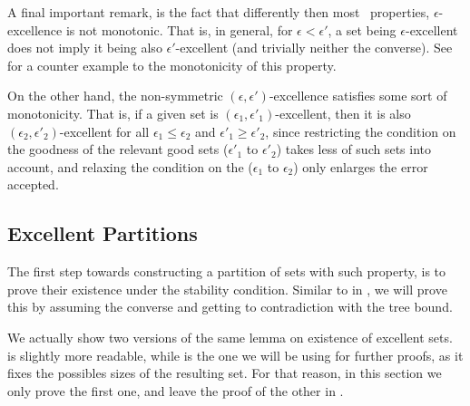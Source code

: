         \begin{remark} \label{rmk:excellence_is_not_monotonic}
            A final important remark, is the fact that differently then most \regular~properties, $\epsilon$-excellence is
            not monotonic. 
            That is, in general, for $\epsilon < \epsilon'$, a set being $\epsilon$-excellent does not imply
            it being also $\epsilon'$-excellent (and trivially neither the converse).
            See  for a counter example to the monotonicity of this property.

            On the other hand, the non-symmetric $(\epsilon, \epsilon')$-excellence satisfies some sort of monotonicity.
            That is, if a given set is $(\epsilon_1, \epsilon'_1)$-excellent, then it is also
            $(\epsilon_2, \epsilon'_2)$-excellent for all $\epsilon_1 \leq \epsilon_2$ and $\epsilon'_1 \geq \epsilon'_2$,
            since restricting the condition on the goodness of the relevant good sets ($\epsilon'_1$ to $\epsilon'_2$)
            takes less of such sets into account, and relaxing the condition on the 
            ($\epsilon_1$ to $\epsilon_2$) only enlarges the error accepted.
        \end{remark}

    \subsection{Excellent Partitions} \label{subsec:subsection_5.2}

        The first step towards constructing a partition of sets with such property, is to prove their existence under the
        stability condition.
        Similar to  in , we will prove this by assuming
        the converse and getting to contradiction with the tree bound.

        We actually show two versions of the same lemma on existence of excellent sets.
         is slightly more readable, while
         is the one we will be using for further
        proofs, as it fixes the possibles sizes of the resulting set.
        For that reason, in this section we only prove the first one, and leave the proof of the other in
        .

